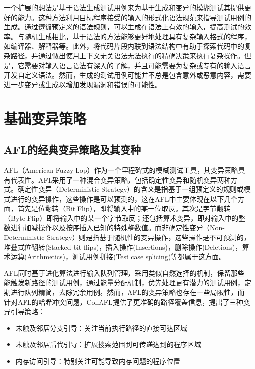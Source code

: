 \documentclass[10.5pt,compsoc]{CjC}
\theoremstyle{mystyle}
\begin{document}
一个扩展的想法是基于语法生成测试用例\cite{Cornelius, Martin}来为基于生成和变异的模糊测试其提供更好的能力。这种方法利用目标程序接受的输入的形式化语法规范来指导测试用例的生成。通过遵循预定义的语法规则，可以生成在语法上有效的输入，提高测试的效率。与随机生成相比，基于语法的方法能够更好地处理具有复杂输入格式的程序，如编译器、解释器等。此外，将代码片段内联到语法结构中有助于探索代码中的复杂路径，并通过做出使用上下文无关语法无法执行的精确决策来执行复杂操作。但是，它需要对输入语言语法有深入的了解，并且可能需要为复杂或专有的输入语言开发自定义语法。然而，生成的测试用例可能并不总是包含意外或恶意内容，需要进一步变异或生成以增加发现漏洞和错误的可能性。
\vspace {10mm}

\section{基础变异策略}

\subsection{AFL的经典变异策略及其变种}

AFL（American Fuzzy Lop）作为一个里程碑式的模糊测试工具，其变异策略具有代表性。AFL采用了一种混合变异策略，包括确定性变异和随机变异两种方式。确定性变异（Deterministic Strategy）的含义是指基于一组预定义的规则或模式进行的变异操作，这些操作是可以预测的，这在AFL中主要体现在以下几个方面，首先是位翻转（Bit Flip），即将输入中的某一位取反。其次是字节翻转（Byte Flip）即将输入中的某一个字节取反；还包括算术变异，即对输入中的整数进行加减操作以及按序插入已知的特殊整数值。而非确定性变异（Non-Deterministic Strategy）则是指基于随机性的变异操作，这些操作是不可预测的，堆叠式位翻转(Stacked bit flips)，插入操作(Insertions)，删除操作(Deletions)，算术运算(Arithmetics)，测试用例拼接(Test case splicing)等都属于这方面。

AFL同时基于进化算法进行输入队列管理，采用类似自然选择的机制，保留那些能触发新路径的测试用例，通过能量分配机制，优先处理更有潜力的测试用例，定期进行队列精简，去除冗余用例\cite{Zhang}。然而，AFL的变异策略也存在一些局限性，而针对AFL的哈希冲突问题，CollAFL提供了更准确的路径覆盖信息\cite{Collafl}，提出了三种变异引导策略：

\begin{itemize}
  \item 未触及邻居分支引导：关注当前执行路径的直接可达区域
  \item 未触及邻居后代引导：扩展搜索范围到可传递达到的程序区域
  \item 内存访问引导：特别关注可能导致内存问题的程序位置
\end{itemize}
\end{document}
